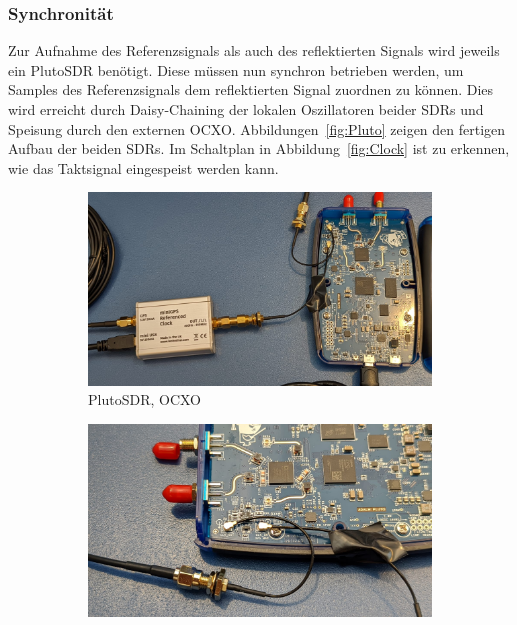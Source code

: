 \subsubsection{Synchronität}\label{sct:Oscillator}
Zur Aufnahme des Referenzsignals als auch des reflektierten Signals wird jeweils ein PlutoSDR benötigt. Diese müssen nun synchron betrieben werden, um Samples des Referenzsignals dem reflektierten Signal zuordnen zu können. Dies wird erreicht durch Daisy-Chaining der lokalen Oszillatoren beider SDRs und Speisung durch den externen OCXO. Abbildungen~\ref{fig:Pluto} zeigen den fertigen Aufbau der beiden SDRs. Im Schaltplan in Abbildung~\ref{fig:Clock} ist zu erkennen, wie das Taktsignal eingespeist werden kann.

\begin{figure}
    \centering
    \begin{subfigure}[Pluto mit Clock]{0.3\textwidth}
        \includegraphics[width=\textwidth]{images/Pluto_1.jpeg}
        \caption{PlutoSDR, OCXO}
    \end{subfigure}
    \begin{subfigure}[Daisy Chaining]{0.3\textwidth}
        \includegraphics[width=\textwidth]{images/Pluto_2.jpeg}

\end{subfigure}
\end{figure}
